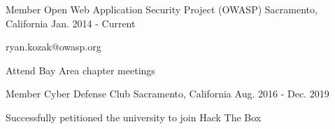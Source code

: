 

\begin{cventries}
  \cventry
    {Member} %
    {Open Web Application Security Project (OWASP)} %
    {Sacramento, California} %
    {Jan. 2014 - Current} %
    {
      \begin{cvitems} %
        \item {ryan.kozak@owasp.org}
        \item {Attend Bay Area chapter meetings}
      \end{cvitems}
    }

  \cventry
    {Member} %
    {Cyber Defense Club} %
    {Sacramento, California} %
    {Aug. 2016 - Dec. 2019} %
    {
      \begin{cvitems} %
        \item {Successfully petitioned the university to join Hack The Box}
      \end{cvitems}
    }

\end{cventries}
